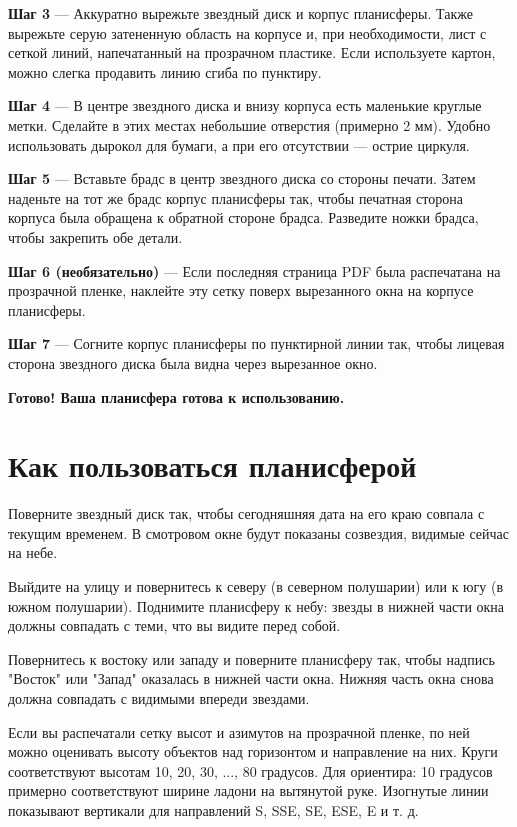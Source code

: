 \documentclass[a4paper,onecolumn,10pt]{article}
\begin{document}
{\bf Шаг 3} --- Аккуратно вырежьте звездный диск и корпус планисферы.
Также вырежьте серую затененную область на корпусе и, при необходимости,
лист с сеткой линий, напечатанный на прозрачном пластике. Если используете
картон, можно слегка продавить линию сгиба по пунктиру.

{\bf Шаг 4} --- В центре звездного диска и внизу корпуса есть маленькие
круглые метки. Сделайте в этих местах небольшие отверстия (примерно 2 мм).
Удобно использовать дырокол для бумаги, а при его отсутствии --- острие
циркуля.

{\bf Шаг 5} --- Вставьте брадс в центр звездного диска со стороны печати.
Затем наденьте на тот же брадс корпус планисферы так, чтобы печатная
сторона корпуса была обращена к обратной стороне брадса. Разведите ножки
брадса, чтобы закрепить обе детали.

{\bf Шаг 6 (необязательно)} --- Если последняя страница PDF была распечатана
на прозрачной пленке, наклейте эту сетку поверх вырезанного окна на корпусе
планисферы.

{\bf Шаг 7} --- Согните корпус планисферы по пунктирной линии так, чтобы
лицевая сторона звездного диска была видна через вырезанное окно.

{\bf Готово! Ваша планисфера готова к использованию.}

\section*{Как пользоваться планисферой}

Поверните звездный диск так, чтобы сегодняшняя дата на его краю совпала
с текущим временем. В смотровом окне будут показаны созвездия, видимые
сейчас на небе.

Выйдите на улицу и повернитесь к северу (в северном полушарии) или к югу
(в южном полушарии). Поднимите планисферу к небу: звезды в нижней части
окна должны совпадать с теми, что вы видите перед собой.

Повернитесь к востоку или западу и поверните планисферу так, чтобы надпись
"Восток" или "Запад" оказалась в нижней части окна. Нижняя часть окна снова
должна совпадать с видимыми впереди звездами.

Если вы распечатали сетку высот и азимутов на прозрачной пленке, по ней
можно оценивать высоту объектов над горизонтом и направление на них. Круги
соответствуют высотам 10, 20, 30, ..., 80 градусов. Для ориентира: 10
градусов примерно соответствуют ширине ладони на вытянутой руке. Изогнутые
линии показывают вертикали для направлений S, SSE, SE, ESE, E и т. д.
\end{document}
